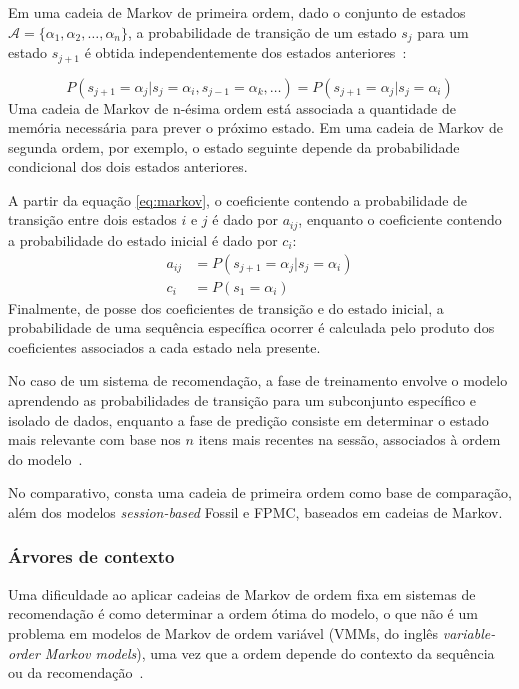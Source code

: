 Em uma cadeia de Markov de primeira ordem, dado o conjunto de estados
$\mathcal{A} = \{\alpha_1, \alpha_2, \dots, \alpha_n\}$, a probabilidade de
transição de um estado $s_j$ para um estado $s_{j+1}$ é obtida independentemente
dos estados anteriores~\cite{rabiner1989tutorial}:

\begin{equation}
    P(s_{j+1} = \alpha_j | s_j = \alpha_i, s_{j-1} = \alpha_k, \dots) = P(s_{j+1} = \alpha_j | s_j = \alpha_i)
    \label{eq:markov}
\end{equation}
Uma cadeia de Markov de n-ésima ordem está associada a quantidade de memória
necessária para prever o próximo estado. Em uma cadeia de Markov de segunda
ordem, por exemplo, o estado seguinte depende da probabilidade condicional dos
dois estados anteriores.

A partir da equação \ref{eq:markov}, o coeficiente contendo a probabilidade de
transição entre dois estados $i$ e $j$ é dado por $a_{ij}$, enquanto o
coeficiente contendo a probabilidade do estado inicial é dado por $c_i$:
\begin{align}
    a_{ij} &= P(s_{j+1} = \alpha_j | s_j = \alpha_i) \\
    c_i &= P(s_1 = \alpha_i)
\end{align}
Finalmente, de posse dos coeficientes de transição e do estado inicial, a
probabilidade de uma sequência específica ocorrer é calculada pelo
produto dos coeficientes associados a cada estado nela presente.

No caso de um sistema de recomendação, a fase de treinamento envolve o modelo
aprendendo as probabilidades de transição para um subconjunto específico e
isolado de dados, enquanto a fase de predição consiste em determinar o estado
mais relevante com base nos $n$ itens mais recentes na sessão, associados à
ordem do modelo~\cite{aggarwal2016recommender}.

No comparativo, consta uma cadeia de primeira ordem como 
base de comparação, além dos modelos \textit{session-based} Fossil e FPMC,
baseados em cadeias de Markov.



\subsubsection{Árvores de contexto}
Uma dificuldade ao aplicar cadeias de Markov de ordem fixa em sistemas de
recomendação é como determinar a ordem ótima do modelo, o que não é um problema
em modelos de Markov de ordem variável (VMMs, do inglês
\textit{variable-order Markov models}), uma vez que a ordem depende do
contexto da sequência ou da recomendação~\cite{mi2016adaptive}.

